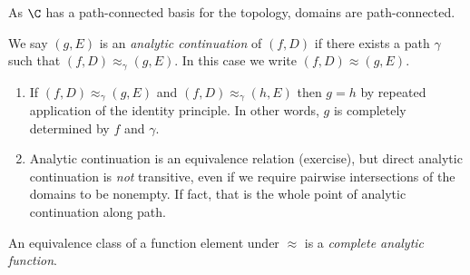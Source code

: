\documentclass[a4paper]{article}
\begin{document}
\begin{remark}
  As \(\C\) has a path-connected basis for the topology, domains are path-connected.
\end{remark}

\begin{definition}
  We say \((g, E)\) is an \emph{analytic continuation} of \((f, D)\) if there exists a path \(\gamma\) such that \((f, D) \approx_\gamma (g, E)\). In this case we write \((f, D) \approx (g, E)\).
\end{definition}

\begin{remark}\leavevmode
  \begin{enumerate}
  \item If \((f, D) \approx_\gamma (g, E)\) and \((f, D) \approx_\gamma (h, E)\) then \(g = h\) by repeated application of the identity principle. In other words, \(g\) is completely determined by \(f\) and \(\gamma\).
  \item Analytic continuation is an equivalence relation (exercise), but direct analytic continuation is \emph{not} transitive, even if we require pairwise intersections of the domains to be nonempty. If fact, that is the whole point of analytic continuation along path.
  \end{enumerate}
\end{remark}

\begin{definition}
  An equivalence class of a function element under \(\approx\) is a \emph{complete analytic function}.
\end{definition}
\end{document}
